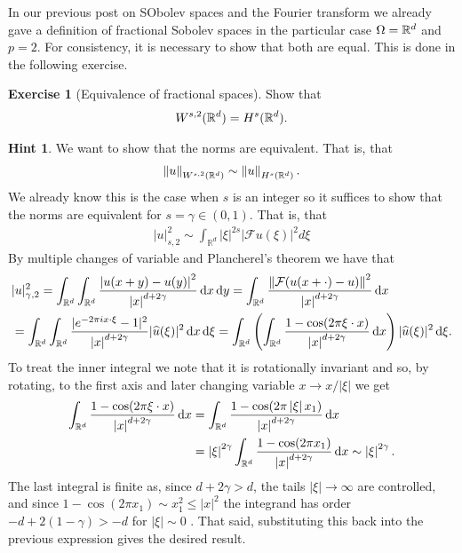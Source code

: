 \documentclass[12pt]{article}
\theoremstyle{definition}
\newtheorem{exercise}{Exercise}
\newtheorem*{hint}{Hint}
\renewcommand{\norm}[1]{\left\lVert #1 \right\rVert}\renewcommand{\abs}[1]{\left| #1 \right|}
\renewcommand{\d}{\,\mathrm{d}}
\begin{document}
In our previous post on SObolev spaces and the Fourier transform we already gave a definition of fractional Sobolev spaces in the particular case $\Omega =\mathbb{R}^d$ and $p=2$. For consistency, it is necessary to show that both are equal. This is done in the following exercise.
\begin{exercise}[Equivalence of fractional spaces]\label{equivalence fractional spaces}
	Show that
	\begin{align*}
		W^{s,2}(\mathbb{R}^d)= H^s(\mathbb{R}^d).
	\end{align*}
\end{exercise}
\begin{hint}
	We want to show that the norms are equivalent. That is, that
	\begin{align*}
		\norm{u}_{W^{s,2}(\R^d)}\sim \norm{u}_{H^s(\R^d)}.
	\end{align*}
	We already know this is the case when $s$ is an integer so it suffices to show that the norms are equivalent for $s= \gamma  \in (0,1)$. That is, that
	\begin{align*}
		|u|_{s,2}^2\sim \int_{\mathbb{R}^d}|\xi|^{2 s}|\mathcal{F} u(\xi)|^2 d \xi
	\end{align*}
	By multiple changes of variable and Plancherel's theorem we have that
	\begin{align*}
		 & |u|_{\gamma ,2}^2  =\int_{\R^d}\int_{\R^d}\frac{\abs{u(x+y)-u(y)}^2}{\abs{x}^{d+2\gamma	}}\d x \d y                                                                                                       = \int_{\R^d}\frac{\norm{\Ff (u(x+\cdot )-u)}^2}{\abs{x}^{d+2\gamma	}}\d x \\
		 & =\int_{\R^d}\int_{\R^d}  \frac{|e^{-2 \pi i x \cdot \xi}-1|^2}{\abs{x}^{d+2\gamma	}}|\wh{u}(\xi)|^2\d x\d\xi =\int_{\R^d}\left(\int_{\R^d}  \frac{1-\cos(2\pi \xi\cdot x)}{\abs{x}^{d+2\gamma	}}\d x\right)|\wh{u}(\xi)|^2\d\xi.
	\end{align*}
	To treat the inner integral we note that it is rotationally invariant and so, by rotating, to the first axis and later changing variable $x \to x / \abs{\xi}$ we get
	\begin{align*}
		\int_{\R^d}  \frac{1-\cos(2\pi \xi\cdot x)}{\abs{x}^{d+2\gamma	}}\d x & =\int_{\R^d}  \frac{1-\cos(2\pi \abs{\xi}x_1 )}{\abs{x}^{d+2\gamma	}}\d x                                          \\
		                                                                      & =\abs{\xi}^{2 \gamma } \int_{\R^d}  \frac{1-\cos(2\pi  x_1) }{\abs{x}^{d+2\gamma	}}\d x\sim \abs{\xi}^{2 \gamma }.
	\end{align*}
	The last integral is finite as, since $d+2\gamma >d$, the tails $\abs{\xi}\to\infty$ are controlled, and since $1-\cos(2\pi x_1)\sim x_1^2\leq \abs{x}^2$ the integrand has order $-d+2(1-\gamma)>-d$ for $\abs{\xi}\sim 0$ . That said, substituting this back into the previous expression gives the desired result.
\end{hint}
\end{document}
